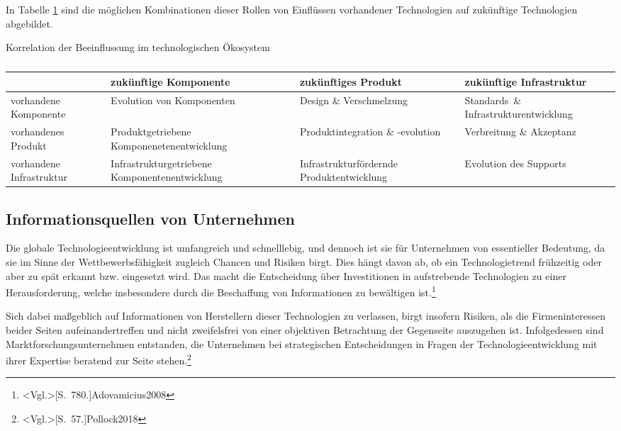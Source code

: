 In Tabelle \ref{tab:influence_path} sind die möglichen Kombinationen dieser Rollen von Einflüssen vorhandener Technologien auf zukünftige Technologien abgebildet.

\begin{table}
	\caption{Korrelation der Beeinflussung im technologischen Ökosystem}
	\centering
	\label{tab:influence_path}
	\begin{tabularx}{\linewidth}{p{}|X|X|X}
         & zukünftige \newline Komponente & zukünftiges \newline Produkt & zukünftige \newline Infrastruktur \\
         \hline
		 vorhandene \newline Komponente & Evolution von Kom\-ponenten & Design \& Verschmelzung & Standards~\& Infra\-struktur\-entwicklung \\
		 \hline
		 vorhandenes \newline Produkt & Produktgetriebene Komponenetenentwicklung & Produktintegration \& -evolution & Verbreitung \& Akzeptanz \\
		 \hline
		 vorhandene \newline Infrastruktur & Infra\-struktur\-getriebene Komponenten\-entwicklung & Infra\-struktur\-fördernde Produkt\-entwicklung & Evolution des Sup\-ports \\
	\end{tabularx}
	\caption*{\protect\citeNP<Quelle: In Anlehnung an>[S.~785]{Adovamicius2008}}
\end{table}

\subsection{Informationsquellen von Unternehmen}
Die globale Technologieentwicklung ist umfangreich und schnelllebig, und dennoch ist sie für Unternehmen von essentieller Bedeutung, da sie im Sinne der Wettbewerbsfähigkeit zugleich Chancen und Risiken birgt. Dies hängt davon ab, ob ein Technologietrend frühzeitig oder aber zu spät erkannt bzw. eingesetzt wird. Das macht die Entscheidung über Investitionen in aufstrebende Technologien zu einer Herausforderung, welche insbesondere durch die Beschaffung von Informationen zu bewältigen ist.\footnote{\citeNP<Vgl.>[S.~780.]{Adovamicius2008}}

Sich dabei maßgeblich auf Informationen von Herstellern dieser Technologien zu verlassen, birgt insofern Risiken, als die Firmeninteressen beider Seiten aufeinandertreffen und nicht zweifelsfrei von einer objektiven Betrachtung der Gegenseite auszugehen ist. Infolgedessen sind Marktforschungsunternehmen entstanden, die Unternehmen bei strategischen Entscheidungen in Fragen der Technologieentwicklung mit ihrer Expertise beratend zur Seite stehen.\footnote{\citeNP<Vgl.>[S.~57.]{Pollock2018}}

